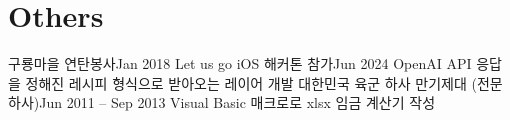 \section{Others}
    \begin{itemize}[leftmargin=0.15in, label={}]
     \resumeSubheading
        {구룡마을 연탄봉사}{Jan 2018}
        {}{}
\resumeSubheading
{Let us go iOS 해커톤 참가}{Jun 2024}
        {OpenAI API 응답을 정해진 레시피 형식으로 받아오는 레이어 개발}{}
    \resumeSubheading
    {대한민국 육군 하사 만기제대 (전문하사)}{Jun 2011 -- Sep 2013}
    {Visual Basic 매크로로 xlsx 임금 계산기 작성}{}
    \end{itemize}
